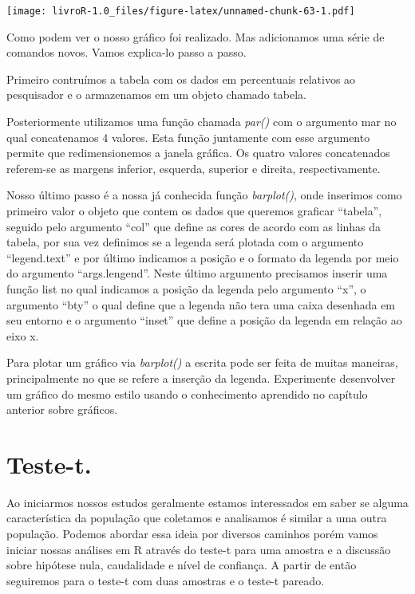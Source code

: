 \documentclass[]{book}
\begin{document}
\texttt{[image: livroR-1.0\_files/figure-latex/unnamed-chunk-63-1.pdf]}

Como podem ver o nosso gráfico foi realizado. Mas adicionamos uma série de comandos novos. Vamos explica-lo passo a passo.

Primeiro contruímos a tabela com os dados em percentuais relativos ao pesquisador e o armazenamos em um objeto chamado tabela.

Posteriormente utilizamos uma função chamada \emph{par()} com o argumento mar no qual concatenamos 4 valores. Esta função juntamente com esse argumento permite que redimensionemos a janela gráfica. Os quatro valores concatenados referem-se as margens inferior, esquerda, superior e direita, respectivamente.

Nosso último passo é a nossa já conhecida função \emph{barplot()}, onde inserimos como primeiro valor o objeto que contem os dados que queremos graficar ``tabela'', seguido pelo argumento ``col'' que define as cores de acordo com as linhas da tabela, por sua vez definimos se a legenda será plotada com o argumento ``legend.text'' e por último indicamos a posição e o formato da legenda por meio do argumento ``args.lengend''. Neste último argumento precisamos inserir uma função list no qual indicamos a posição da legenda pelo argumento ``x'', o argumento ``bty'' o qual define que a legenda não tera uma caixa desenhada em seu entorno e o argumento ``inset'' que define a posição da legenda em relação ao eixo x.

Para plotar um gráfico via \emph{barplot()} a escrita pode ser feita de muitas maneiras, principalmente no que se refere a inserção da legenda. Experimente desenvolver um gráfico do mesmo estilo usando o conhecimento aprendido no capítulo anterior sobre gráficos.

\hypertarget{teste-t.}{%
\chapter{Teste-t.}\label{teste-t.}}

Ao iniciarmos nossos estudos geralmente estamos interessados em saber se alguma característica da população que coletamos e analisamos é similar a uma outra população. Podemos abordar essa ideia por diversos caminhos porém vamos iniciar nossas análises em R através do teste-t para uma amostra e a discussão sobre hipótese nula, caudalidade e nível de confiança. A partir de então seguiremos para o teste-t com duas amostras e o teste-t pareado.
\end{document}
